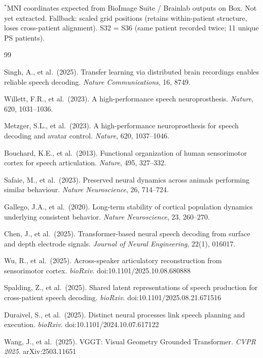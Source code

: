 \documentclass[11pt,letterpaper]{article}
\begin{document}
\noindent $^*$MNI coordinates expected from BioImage Suite / Brainlab outputs on Box. Not yet extracted. Fallback: scaled grid positions (retains within-patient structure, loses cross-patient alignment). S32 = S36 (same patient recorded twice; 11 unique PS patients).


\begin{thebibliography}{99}\raggedright

Singh, A., et al.\ (2025).
Transfer learning via distributed brain recordings enables reliable speech decoding.
\textit{Nature Communications}, 16, 8749.

Willett, F.R., et al.\ (2023).
A high-performance speech neuroprosthesis.
\textit{Nature}, 620, 1031--1036.

Metzger, S.L., et al.\ (2023).
A high-performance neuroprosthesis for speech decoding and avatar control.
\textit{Nature}, 620, 1037--1046.

Bouchard, K.E., et al.\ (2013).
Functional organization of human sensorimotor cortex for speech articulation.
\textit{Nature}, 495, 327--332.

Safaie, M., et al.\ (2023).
Preserved neural dynamics across animals performing similar behaviour.
\textit{Nature Neuroscience}, 26, 714--724.

Gallego, J.A., et al.\ (2020).
Long-term stability of cortical population dynamics underlying consistent behavior.
\textit{Nature Neuroscience}, 23, 260--270.

Chen, J., et al.\ (2025).
Transformer-based neural speech decoding from surface and depth electrode signals.
\textit{Journal of Neural Engineering}, 22(1), 016017.

Wu, R., et al.\ (2025).
Across-speaker articulatory reconstruction from sensorimotor cortex.
\textit{bioRxiv}. doi:10.1101/2025.10.08.680888

Spalding, Z., et al.\ (2025).
Shared latent representations of speech production for cross-patient speech decoding.
\textit{bioRxiv}. doi:10.1101/2025.08.21.671516

Duraivel, S., et al.\ (2025).
Distinct neural processes link speech planning and execution.
\textit{bioRxiv}. doi:10.1101/2024.10.07.617122

Wang, J., et al.\ (2025).
VGGT: Visual Geometry Grounded Transformer.
\textit{CVPR 2025}. arXiv:2503.11651


\end{thebibliography}
\end{document}
